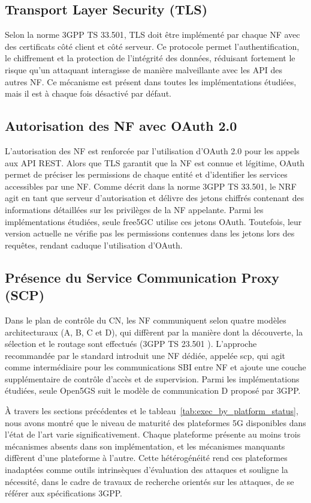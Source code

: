 \documentclass[a4paper,11pt,twoside]{StyleThese}
\begin{document}
\subsection{Transport Layer Security (TLS)}
Selon la norme 3GPP TS 33.501\cite{ts_33501}, TLS doit être implémenté par chaque NF avec des certificats côté client et côté serveur. Ce protocole permet l’authentification, le chiffrement et la protection de l’intégrité des données, réduisant fortement le risque qu’un attaquant interagisse de manière malveillante avec les API des autres NF. Ce mécanisme est présent dans toutes les implémentations étudiées, mais il est à chaque fois désactivé par défaut.

\subsection{Autorisation des NF avec OAuth 2.0}
L’autorisation des NF est renforcée par l’utilisation d’OAuth 2.0 pour les appels aux API REST. Alors que TLS garantit que la NF est connue et légitime, OAuth permet de préciser les permissions de chaque entité et d’identifier les services accessibles par une NF. Comme décrit dans la norme 3GPP TS 33.501\cite{ts_33501}, le NRF agit en tant que serveur d’autorisation et délivre des jetons chiffrés contenant des informations détaillées sur les privilèges de la NF appelante. 
%
Parmi les implémentations étudiées, seule free5GC utilise ces jetons OAuth. Toutefois, leur version actuelle ne vérifie pas les permissions contenues dans les jetons lors des requêtes, rendant caduque l'utilisation d'OAuth.

\subsection{Présence du Service Communication Proxy (SCP)}
Dans le plan de contrôle du CN, les NF communiquent selon quatre modèles architecturaux (A, B, C et D), qui diffèrent par la manière dont la découverte, la sélection et le routage sont effectués (3GPP TS 23.501 \cite{ts_23501}). L’approche recommandée par le standard introduit une NF dédiée, appelée \gls{scp}, qui agit comme intermédiaire pour les communications SBI entre NF et ajoute une couche supplémentaire de contrôle d’accès et de supervision. Parmi les implémentations étudiées, seule Open5GS suit le modèle de communication D proposé par 3GPP.

\vspace{0.5cm}

À travers les sections précédentes et le tableau~\ref{tab:exec_by_platform_status}, nous avons montré que le niveau de maturité des plateformes 5G disponibles dans l’état de l’art varie significativement. Chaque plateforme présente au moins trois mécanismes absents dans son implémentation, et les mécanismes manquants diffèrent d’une plateforme à l’autre. Cette hétérogénéité rend ces plateformes inadaptées comme outils intrinsèques d’évaluation des attaques et souligne la nécessité, dans le cadre de travaux de recherche orientés sur les attaques, de se référer aux spécifications 3GPP.
\end{document}
